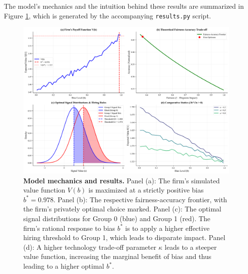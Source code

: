The model's mechanics and the intuition behind these results are summarized in Figure \ref{fig:main_results}, which is generated by the accompanying \texttt{results.py} script.

\begin{figure}[H]
    \centering
    \includegraphics[width=\textwidth]{../figures/figure_1_model_mechanics.png}
    \caption[Model mechanics and results]{\textbf{Model mechanics and results.} 
    Panel (a): The firm's simulated value function $V(b)$ is maximized at a strictly positive bias $b^*=0.978$. 
    Panel (b): The respective fairness-accuracy frontier, with the firm's privately optimal choice marked. 
    Panel (c): The optimal signal distributions for Group 0 (blue) and Group 1 (red). The firm's rational response to bias $b^*$ is to apply a higher effective hiring threshold to Group 1, which leads to disparate impact.
    Panel (d): A higher technology trade-off parameter $\kappa$ leads to a steeper value function, increasing the marginal benefit of bias and thus leading to a higher optimal $b^*$.}
    \label{fig:main_results}
\end{figure}